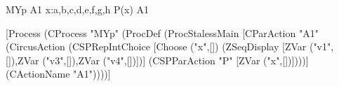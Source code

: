 \begin{circus}
\circprocess MYp \circdef
	\circbegin
		A1 \circdef \Intchoice x:\langle a,b,c,d,e,f,g,h \rangle \circspot P(x)
		\circspot A1
		\circend
\end{circus}

[Process (CProcess "MYp" (ProcDef (ProcStalessMain [CParAction "A1" (CircusAction (CSPRepIntChoice [Choose ("x",[]) (ZSeqDisplay [ZVar ("v1",[]),ZVar ("v3",[]),ZVar ("v4",[])])] (CSPParAction "P" [ZVar ("x",[])])))] (CActionName "A1"))))]
